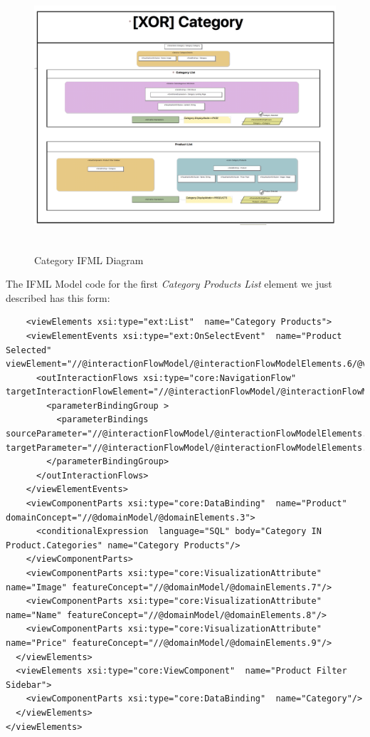 \begin{figure}[H]
  \centering
    \includegraphics[height=10cm]{images/diagrams/before/ifml-category.png}
  \caption{Category IFML Diagram}
  \label{fig:ifml-before-category}
\end{figure}
\vspace{0.5cm}

The IFML Model code for the first \textit{Category Products List} element we just described has this form: 

\lstset{language=XML}
\begin{lstlisting} 
    <viewElements xsi:type="ext:List"  name="Category Products">
    <viewElementEvents xsi:type="ext:OnSelectEvent"  name="Product Selected" viewElement="//@interactionFlowModel/@interactionFlowModelElements.6/@viewElements.1/@viewElements.0">
      <outInteractionFlows xsi:type="core:NavigationFlow"  targetInteractionFlowElement="//@interactionFlowModel/@interactionFlowModelElements.1">
        <parameterBindingGroup >
          <parameterBindings  sourceParameter="//@interactionFlowModel/@interactionFlowModelElements.1/@parameters.0" targetParameter="//@interactionFlowModel/@interactionFlowModelElements.1/@parameters.0"/>
        </parameterBindingGroup>
      </outInteractionFlows>
    </viewElementEvents>
    <viewComponentParts xsi:type="core:DataBinding"  name="Product" domainConcept="//@domainModel/@domainElements.3">
      <conditionalExpression  language="SQL" body="Category IN Product.Categories" name="Category Products"/>
    </viewComponentParts>
    <viewComponentParts xsi:type="core:VisualizationAttribute"  name="Image" featureConcept="//@domainModel/@domainElements.7"/>
    <viewComponentParts xsi:type="core:VisualizationAttribute"  name="Name" featureConcept="//@domainModel/@domainElements.8"/>
    <viewComponentParts xsi:type="core:VisualizationAttribute"  name="Price" featureConcept="//@domainModel/@domainElements.9"/>
  </viewElements>
  <viewElements xsi:type="core:ViewComponent"  name="Product Filter Sidebar">
    <viewComponentParts xsi:type="core:DataBinding"  name="Category"/>
  </viewElements>
</viewElements>
\end{lstlisting}

